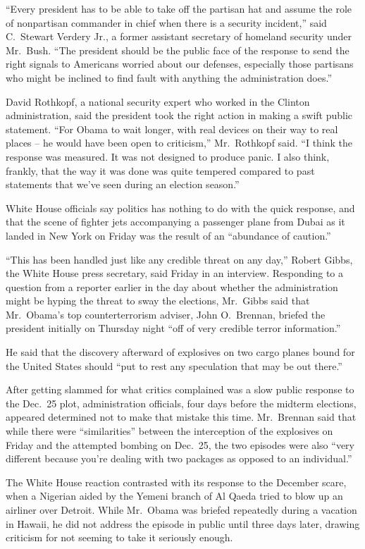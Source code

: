 ﻿\documentclass[12pt]{article}
\begin{document}
``Every president has to be able to take off the partisan hat and assume the role of nonpartisan
commander in chief when there is a security incident,'' said C.~Stewart Verdery Jr., a former
assistant secretary of homeland security under Mr.~Bush. ``The president should be the public face
of the response to send the right signals to Americans worried about our defenses, especially those
partisans who might be inclined to find fault with anything the administration does.''

David Rothkopf, a national security expert who worked in the Clinton administration, said the
president took the right action in making a swift public statement. ``For Obama to wait longer, with
real devices on their way to real places -- he would have been open to criticism,'' Mr.~Rothkopf
said. ``I think the response was measured. It was not designed to produce panic. I also think,
frankly, that the way it was done was quite tempered compared to past statements that we've seen
during an election season.''

White House officials say politics has nothing to do with the quick response, and that the scene of
fighter jets accompanying a passenger plane from Dubai as it landed in New York on Friday was the
result of an ``abundance of caution.''

``This has been handled just like any credible threat on any day,'' Robert Gibbs, the White House
press secretary, said Friday in an interview. Responding to a question from a reporter earlier in
the day about whether the administration might be hyping the threat to sway the elections, Mr.~Gibbs
said that Mr.~Obama's top counterterrorism adviser, John O.~Brennan, briefed the president initially
on Thursday night ``off of very credible terror information.''

He said that the discovery afterward of explosives on two cargo planes bound for the United States
should ``put to rest any speculation that may be out there.''

After getting slammed for what critics complained was a slow public response to the Dec.~25 plot,
administration officials, four days before the midterm elections, appeared determined not to make
that mistake this time. Mr.~Brennan said that while there were ``similarities'' between the
interception of the explosives on Friday and the attempted bombing on Dec.~25, the two episodes were
also ``very different because you're dealing with two packages as opposed to an individual.''

The White House reaction contrasted with its response to the December scare, when a Nigerian aided
by the Yemeni branch of Al Qaeda tried to blow up an airliner over Detroit. While Mr.~Obama was
briefed repeatedly during a vacation in Hawaii, he did not address the episode in public until three
days later, drawing criticism for not seeming to take it seriously enough.
\end{document}

